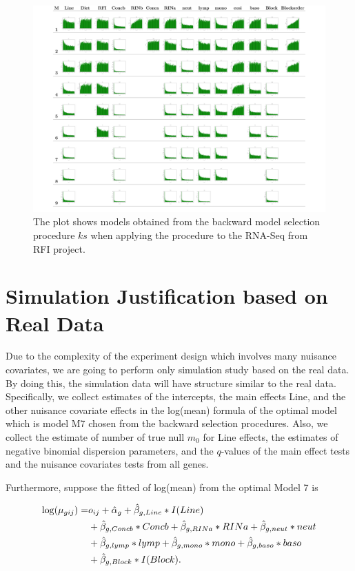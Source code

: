 \documentclass[12pt, letter]{article}\usepackage[]{graphicx}\usepackage[]{color}
\begin{document}
\begin{figure}
\centering
\includegraphics[scale = 0.22]{PlotG9P2PairedEndCBCks.png}
\caption{The plot shows models obtained from the backward model selection procedure $ks$ when applying the procedure to the RNA-Seq from RFI project. }
\label{realdataplotks}
\end{figure}


\section{ Simulation Justification based on Real Data}
Due to the complexity of the experiment design which involves many nuisance covariates, we are going to perform only simulation study based on the real data. By doing this, the simulation data will have structure similar to the real data. Specifically, we collect estimates  of the intercepts, the main effects Line, and the other nuisance covariate effects in the log(mean) formula of the optimal model which is model M7 chosen from the backward selection procedures. Also, we collect  the estimate of  number of true null $m_{0}$ for Line effects,  the estimates of negative binomial dispersion parameters, and the $q$-values of the main effect tests and the nuisance covariates tests from all genes.

Furthermore, suppose the fitted of log(mean)  from the optimal  Model 7 is 

\begin{align}\label{eq1}
\log(\mu_{gij}) = & o_{ij} +\hat{\alpha}_g + \hat{\beta}_{g,Line}*I(Line) \notag\\
     & +  \hat{\beta}_{g,Concb}*Concb +  \hat{\beta}_{g,RINa}*RINa + \hat{\beta}_{g,neut}*neut \notag \\
     & + \hat{\beta}_{g,lymp}*lymp + \hat{\beta}_{g,mono}*mono + \hat{\beta}_{g,baso}*baso \notag\\
    &  + \hat{\beta}_{g,Block}*I(Block).
\end{align}
\end{document}
